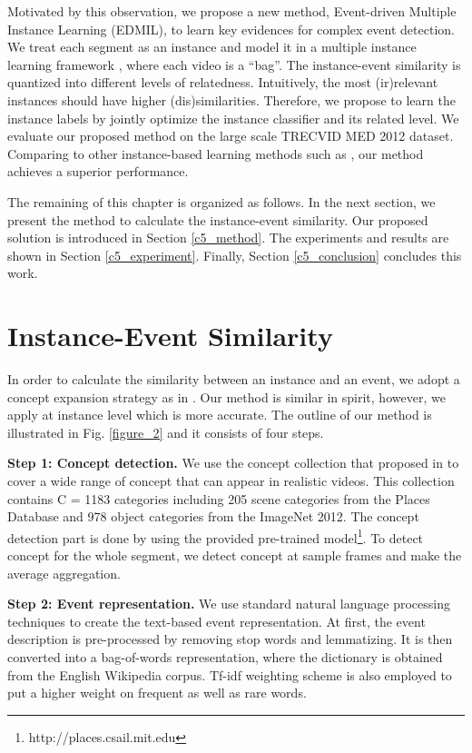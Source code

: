 Motivated by this observation, we propose a new method, Event-driven Multiple Instance Learning (EDMIL), to learn key evidences for complex event detection. We treat each segment as an instance and model it in a multiple instance learning framework \cite{andrews2002support}, where each video is a ``bag''. The instance-event similarity is quantized into different levels of relatedness. Intuitively, the most (ir)relevant instances should have higher (dis)similarities. Therefore, we propose to learn the instance labels by jointly optimize the instance classifier and its related level. We evaluate our proposed method on the large scale TRECVID MED 2012 dataset. Comparing to other instance-based learning methods such as \cite{andrews2002support,lai2014video}, our method achieves a superior performance.

The remaining of this chapter is organized as follows. In the next section, we present the method to calculate the instance-event similarity. Our proposed solution is introduced in Section \ref{c5_method}. The experiments and results are shown in Section \ref{c5_experiment}. Finally, Section \ref{c5_conclusion} concludes this work.

\section{Instance-Event Similarity}
In order to calculate the similarity between an instance and an event, we adopt a concept expansion strategy as in \cite{chen2014event}. Our method is similar in spirit, however, we apply at instance level which is more accurate. The outline of our method is illustrated in Fig. \ref{figure_2} and it consists of four steps.

\textbf{Step 1: Concept detection.} We use the concept collection that proposed in \cite{zhou2014learning} to cover a wide range of concept that can appear in realistic videos. This collection contains C = 1183 categories including 205 scene categories from the Places Database\cite{zhou2014learning} and 978 object categories from the ImageNet 2012\cite{deng2009imagenet}. The concept detection part is done by using the provided pre-trained model\footnote{http://places.csail.mit.edu}. To detect concept for the whole segment, we detect concept at sample frames and make the average aggregation.   

\textbf{Step 2: Event representation.} We use standard natural language processing techniques to create the text-based event representation. At first, the event description is pre-processed by removing stop words and lemmatizing. It is then converted into a bag-of-words representation, where the dictionary is obtained from the English Wikipedia corpus. Tf-idf weighting scheme is also employed to put a higher weight on frequent as well as rare words.   

